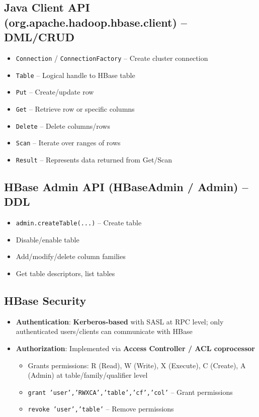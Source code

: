 \documentclass[11pt, onecolumn, a4paper]{article}
\begin{document}
\subsection{Java Client API (org.apache.hadoop.hbase.client) -- DML/CRUD}

\begin{itemize}
  \item \texttt{Connection} / \texttt{ConnectionFactory} -- Create cluster connection
  \item \texttt{Table} -- Logical handle to HBase table
  \item \texttt{Put} -- Create/update row
  \item \texttt{Get} -- Retrieve row or specific columns
  \item \texttt{Delete} -- Delete columns/rows
  \item \texttt{Scan} -- Iterate over ranges of rows
  \item \texttt{Result} -- Represents data returned from Get/Scan
\end{itemize}

\subsection{HBase Admin API (HBaseAdmin / Admin) -- DDL}

\begin{itemize}
  \item \texttt{admin.createTable(...)} -- Create table
  \item Disable/enable table
  \item Add/modify/delete column families
  \item Get table descriptors, list tables
\end{itemize}

\subsection{HBase Security}

\begin{itemize}
  \item \textbf{Authentication}: \textbf{Kerberos-based} with SASL at RPC level; only authenticated users/clients can communicate with HBase
  \item \textbf{Authorization}: Implemented via \textbf{Access Controller / ACL coprocessor}
  \begin{itemize}
    \item Grants permissions: R (Read), W (Write), X (Execute), C (Create), A (Admin) at table/family/qualifier level
    \item \texttt{grant 'user','RWXCA','table','cf','col'} -- Grant permissions
    \item \texttt{revoke 'user','table'} -- Remove permissions
  \end{itemize}
\end{itemize}
\end{document}
